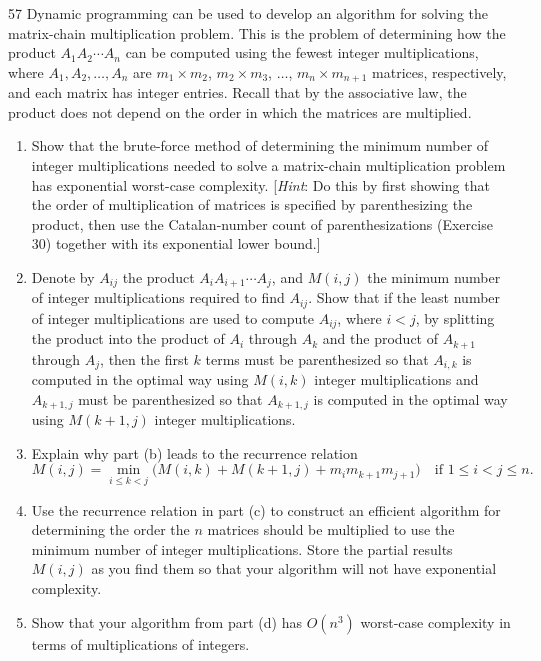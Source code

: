 \documentclass[11pt]{article}
\begin{document}
\begin{exercise}{57}
    Dynamic programming can be used to develop an algorithm for
    solving the matrix-chain multiplication problem. This is the
    problem of determining how the product $A_1 A_2 \cdots A_n$ can be
    computed using the fewest integer multiplications, where
    $A_1, A_2, \dots, A_n$ are $m_1 \times m_2$, $m_2 \times m_3$,
    $\dots$, $m_n \times m_{n+1}$ matrices, respectively, and each
    matrix has integer entries. Recall that by the associative law,
    the product does not depend on the order in which the matrices
    are multiplied.
    \begin{enumerate}[label=(\alph*)]
        \item Show that the brute-force method of determining the
        minimum number of integer multiplications needed to solve a
        matrix-chain multiplication problem has exponential
        worst-case complexity.
        [\emph{Hint}: Do this by first showing that the order of
        multiplication of matrices is specified by parenthesizing the
        product, then use the Catalan-number count of parenthesizations
        (Exercise 30) together with its exponential lower bound.]
        \item Denote by $A_{ij}$ the product $A_i A_{i+1} \cdots A_j$,
        and $M(i,j)$ the minimum number of integer multiplications
        required to find $A_{ij}$. Show that if the least number of
        integer multiplications are used to compute $A_{ij}$, where
        $i < j$, by splitting the product into the product of $A_i$
        through $A_k$ and the product of $A_{k+1}$ through $A_j$,
        then the first $k$ terms must be parenthesized so that
        $A_{i,k}$ is computed in the optimal way using $M(i,k)$
        integer multiplications and $A_{k+1,j}$ must be parenthesized
        so that $A_{k+1,j}$ is computed in the optimal way using
        $M(k+1,j)$ integer multiplications.
        \item Explain why part (b) leads to the recurrence relation
        \[
        M(i,j) = \min_{i \leq k < j} \big(M(i,k) + M(k+1,j) + m_i
        m_{k+1} m_{j+1}\big) \quad \text{if } 1 \leq i < j \leq n.
        \]
        \item Use the recurrence relation in part (c) to construct an
        efficient algorithm for determining the order the $n$
        matrices should be multiplied to use the minimum number of
        integer multiplications. Store the partial results $M(i,j)$
        as you find them so that your algorithm will not have
        exponential complexity.
        \item Show that your algorithm from part (d) has $O(n^3)$
        worst-case complexity in terms of multiplications of
        integers.
    \end{enumerate}
\end{exercise}
\end{document}
